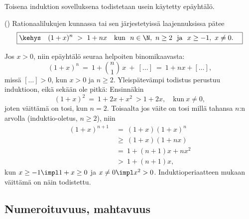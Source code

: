Toisena induktion sovelluksena todistetaan usein käytetty epäyhtälö.
\begin{Prop} () \label{Bernoulli} 
Rationaalilukujen kunnassa tai sen järjestetyissä laajennuksissa pätee
\[
\boxed{\kehys\quad (1+x)^n\ >\ 1+nx \quad 
     \text{kun}\ \  n \in \N,\ n \ge 2\ \ \text{ja}\ \ x \ge -1,\ x \neq 0. \quad}
\] 
\end{Prop}
\tod Jos $x>0$, niin epäyhtälö seuraa helpoiten binomikaavasta:
\[
(1+x)^n\ =\ 1 + \binom{n}{1}\,x\ +\ [\ldots]\ =\ 1 + nx + [\ldots],
\]
missä $[\ldots] > 0$, kun $x>0$ ja $n \ge 2$. Yleispätevämpi todistus perustuu induktioon,
eikä sekään ole pitkä: Ensinnäkin
\[
(1+x)^2\ =\ 1+2x+x^2\ > 1+2x, \quad \text{kun}\ x \neq 0,
\]
joten väittämä on tosi, kun $n=2$. Toisaalta jos väite on tosi millä tahansa $n$:n arvolla 
(induktio-oletus, $n \ge 2$), niin
\begin{align*}
(1+x)^{n+1}\ &=\   (1+x)(1+x)^n      \\
             &\ge\ (1+x)(1+nx)       \\ 
             &=\   1 + (n+1)x + nx^2 \\
             &>\   1 + (n+1)x,
\end{align*}
kun $x \ge -1 \impl 1+x \ge 0$ ja $x \neq 0 \impl x^2 > 0$. Induktioperiaatteen mukaan väittämä
on näin todistettu. \loppu

\subsection*{Numeroituvuus, mahtavuus}

